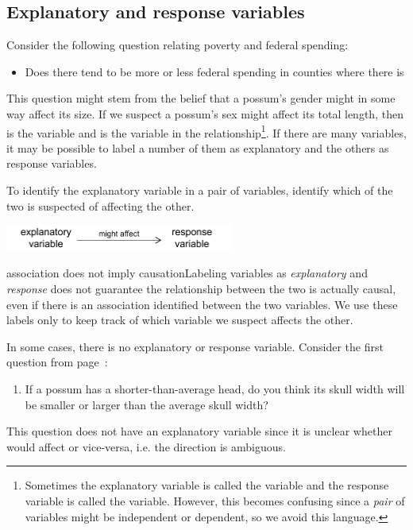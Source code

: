 \subsection{Explanatory and response variables}
\label{explanatoryAndResponse}

Consider the following question relating poverty and federal spending:
\begin{itemize}
\item[] Does there tend to be more or less federal spending in counties where there is 
\end{itemize}
This question might stem from the belief that a possum's gender might in some way affect its size. If we suspect a possum's sex might affect its total length, then  is the  variable and  is the  variable in the relationship\footnote{Sometimes the explanatory variable is called the  variable and the response variable is called the  variable. However, this becomes confusing since a \emph{pair} of variables might be independent or dependent, so we avoid this language.}. If there are many variables, it may be possible to label a number of them as explanatory and the others as response variables.

\begin{tipBox}{
To identify the explanatory variable in a pair of variables, identify which of the two is suspected of affecting the other.

\hspace{10mm}\includegraphics[height=0.34in]{01/figures/expResp/expResp}}
\end{tipBox}

\begin{caution}{association does not imply causation}{Labeling variables as \emph{explanatory} and \emph{response} does not guarantee the relationship between the two is actually causal, even if there is an association identified between the two variables. We use these labels only to keep track of which variable we suspect affects the other.}
\end{caution}

In some cases, there is no explanatory or response variable. Consider the first question from page~\pageref{countyPovertyIncomeQuestion}:
\begin{enumerate}
\item[(1)] If a possum has a shorter-than-average head, do you think its skull width will be smaller or larger than the average skull width?
\end{enumerate}
This question does not have an explanatory variable since it is unclear whether  would affect  or vice-versa, i.e. the direction is ambiguous.

